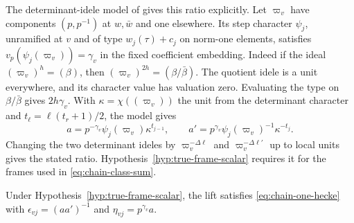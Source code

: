 The determinant-idele model of \citep[Definition~11.23 and
Proposition~11.27]{adriazola-grh} gives this ratio explicitly.
Let $\varpi_v$ have components $(p,p^{-1})$ at $w,\bar w$ and one
elsewhere. Its step character $\psi_j$, unramified at $v$ and of
type $w_j(\tau)+c_j$ on norm-one elements, satisfies
$v_p(\psi_j(\varpi_v))=\gamma_v$ in the fixed coefficient embedding.
Indeed if the ideal $(\varpi_v)^h=(\beta)$, then
$(\varpi_v)^{2h}=(\beta/\bar\beta)$. The quotient idele is a unit
everywhere, and its character value has valuation zero. Evaluating the
type on $\beta/\bar\beta$ gives $2h\gamma_v$.
With $\kappa=\chi((\varpi_v))$ the unit from the determinant character
and $t_\ell=\ell(t_r+1)/2$, the model gives
\[
 a=p^{-\gamma_v}\psi_j(\varpi_v)\kappa^{t_{j-1}},\qquad
 a'=p^{\gamma_v}\psi_j(\varpi_v)^{-1}\kappa^{-t_j}.
\]
Changing the two determinant ideles by $\varpi_v^{-\Delta\ell}$
and $\varpi_v^{-\Delta\ell'}$ up to local units gives the stated ratio.
Hypothesis~\ref{hyp:true-frame-scalar} requires it for the frames
used in \eqref{eq:chain-class-sum}.

\begin{proposition}\label{prop:true-hecke}
Under Hypothesis~\ref{hyp:true-frame-scalar}, the lift satisfies
\eqref{eq:chain-one-hecke} with
$\epsilon_{vj}=(aa')^{-1}$ and $\eta_{vj}=p^{\gamma_v}a$.
\end{proposition}

